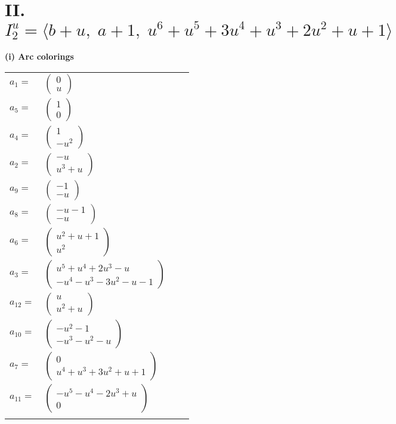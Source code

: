 \documentclass[1p]{elsarticle_modified}
\theoremstyle{definition}
\begin{document}
\centering \section*{II. $I^u_{2}= \langle b+u,\;a+1,\;u^6+u^5+3 u^4+u^3+2 u^2+u+1 \rangle$}
\flushleft \textbf{(i) Arc colorings}\\
\begin{tabular}{m{7pt} m{180pt} m{7pt} m{180pt} }
\flushright $a_{1}=$&$\begin{pmatrix}0\\u\end{pmatrix}$ \\
\flushright $a_{5}=$&$\begin{pmatrix}1\\0\end{pmatrix}$ \\
\flushright $a_{4}=$&$\begin{pmatrix}1\\- u^2\end{pmatrix}$ \\
\flushright $a_{2}=$&$\begin{pmatrix}- u\\u^3+u\end{pmatrix}$ \\
\flushright $a_{9}=$&$\begin{pmatrix}-1\\- u\end{pmatrix}$ \\
\flushright $a_{8}=$&$\begin{pmatrix}- u-1\\- u\end{pmatrix}$ \\
\flushright $a_{6}=$&$\begin{pmatrix}u^2+u+1\\u^2\end{pmatrix}$ \\
\flushright $a_{3}=$&$\begin{pmatrix}u^5+u^4+2 u^3- u\\- u^4- u^3-3 u^2- u-1\end{pmatrix}$ \\
\flushright $a_{12}=$&$\begin{pmatrix}u\\u^2+u\end{pmatrix}$ \\
\flushright $a_{10}=$&$\begin{pmatrix}- u^2-1\\- u^3- u^2- u\end{pmatrix}$ \\
\flushright $a_{7}=$&$\begin{pmatrix}0\\u^4+u^3+3 u^2+u+1\end{pmatrix}$ \\
\flushright $a_{11}=$&$\begin{pmatrix}- u^5- u^4-2 u^3+u\\0\end{pmatrix}$\\&\end{tabular}
\end{document}
